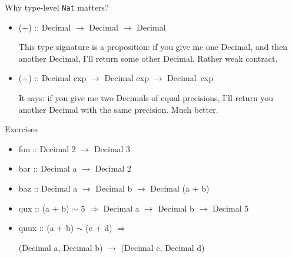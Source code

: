 \documentclass[handout]{beamer}
\begin{document}
\begin{frame}[fragile]{Why type-level {\tt Nat} matters?}

\begin{itemize}

\item (+) :: Decimal $\to$ Decimal $\to$ Decimal

    This type signature is a proposition: if you give me one Decimal,
    and then another Decimal, I'll return some other Decimal. Rather weak contract.

\item (+) :: Decimal exp $\to$ Decimal exp $\to$ Decimal~exp

    It says: if you give me two Decimals of equal precisions,
    I'll return you another Decimal with the same precision. Much better.

\end{itemize}

\end{frame}

\begin{frame}[fragile]{Exercises}

\begin{itemize}

\item foo :: Decimal 2 $\to$ Decimal 3

\item bar :: Decimal a $\to$ Decimal 2

\item baz :: Decimal a $\to$ Decimal b $\to$ Decimal (a + b)

\item qux :: (a + b) $\sim$ 5 $\Rightarrow$ Decimal a $\to$ Decimal b $\to$ Decimal 5

\item quux :: (a + b) $\sim$ (c + d) $\Rightarrow$
\par (Decimal a, Decimal b) $\to$ (Decimal c, Decimal d)

\end{itemize}

\end{frame}
\end{document}
